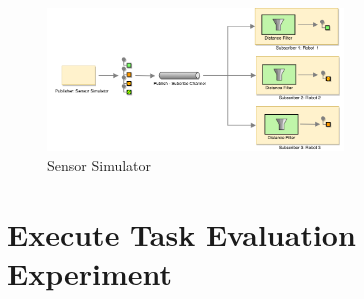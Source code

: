 \begin{figure}
\centering
\includegraphics[width = 0.7\textwidth]{content/images/ch4/sensor_simulator.drawio.png}
\caption{Sensor Simulator}
\label{fig:sensor_simulator}
\end{figure}


\section{Execute Task Evaluation Experiment}


